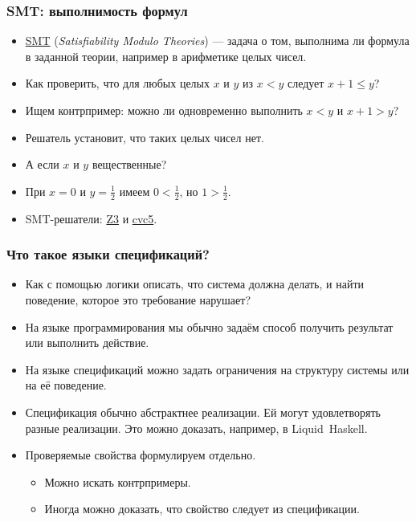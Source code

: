 \documentclass[11pt]{beamer}
\begin{document}
\begin{frame}
  \frametitle{SMT: выполнимость формул}
  \begin{itemize}
    \item \href{https://en.wikipedia.org/wiki/Satisfiability_modulo_theories}{SMT} (\textit{Satisfiability Modulo Theories}) — задача о том, выполнима ли формула в заданной теории, например в арифметике целых чисел.
    \item Как проверить, что для любых целых $x$ и $y$ из $x < y$ следует $x + 1 \le y$?
    \pause
    \item Ищем контрпример: можно ли одновременно выполнить $x < y$ и $x + 1 > y$?
    \pause
    \item Решатель установит, что таких целых чисел нет.
    \item А если $x$ и $y$ вещественные?
    \pause
    \item При $x=0$ и $y=\tfrac12$ имеем $0<\tfrac12$, но $1>\tfrac12$.
    \item SMT-решатели: \href{https://github.com/Z3Prover/z3}{Z3} и \href{https://cvc5.github.io/}{cvc5}.
  \end{itemize}
\end{frame}

\begin{frame}
  \frametitle{Что такое языки спецификаций?}
  \small
  \begin{itemize}
    \setlength{\itemsep}{0pt}
    \item Как с помощью логики описать, что система должна делать, и найти поведение, которое это требование нарушает?
    \pause
    \item На языке программирования мы обычно задаём способ получить результат или выполнить действие.
    \item На языке спецификаций можно задать ограничения на структуру системы или на её поведение.
    \item Спецификация обычно абстрактнее реализации. Ей могут удовлетворять разные реализации. Это можно доказать, например, в Liquid~Haskell.
    \pause
    \item Проверяемые свойства формулируем отдельно.
      \begin{itemize}
        \item Можно искать контрпримеры.
        \item Иногда можно доказать, что свойство следует из спецификации.
      \end{itemize}
  \end{itemize}
\end{frame}
\end{document}
